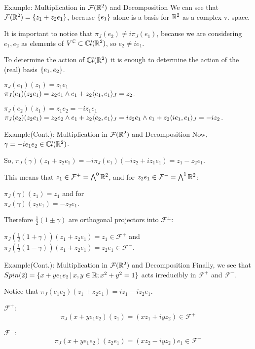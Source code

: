 \begin{frame}{Example: Multiplication in $\mathcal F(\mathbb R^2)$ and Decomposition} %
    We can see that $\mathcal F(\mathbb R^2) = \{z_1 + z_2 e_1\}$, because $\{e_1\}$ alone is a basis for $\mathbb R^2$ as a complex v. space.
    
    It is important to notice that $\pi_J(e_2) \neq i \pi_J(e_1)$, because we are considering $e_1, e_2$ as elements of $V^\mathbb C \subset \mathbb C l(\mathbb R^2)$, so $e_2 \neq i e_1$.
    
    To determine the action of $\mathbb C l(\mathbb R^2)$ it is enough to determine the action of the (real) basis $\{e_1, e_2\}$.
    
    
    $\pi_J(e_1) (z_1) = z_1 e_1$\\
    $\pi_J(e_1)(z_2 e_1) = z_2 e_1 \wedge e_1 + z_2 \langle e_1, e_1\rangle_J = z_2$.
    
    
    $\pi_J(e_2) (z_1) = z_1 e_2 = -i z_1 e_1$ \\
    $\pi_J(e_2)(z_2 e_1) = z_2 e_2 \wedge e_1 + z_2 \langle e_2, e_1\rangle_J = i z_2 e_1 \wedge e_1 + z_2\langle i e_1, e_1 \rangle_J = -i z_2$.
    
\end{frame}

\begin{frame}{Example(Cont.): Multiplication in $\mathcal F(\mathbb R^2)$ and Decomposition} %
    Now, $\gamma = -i e_1 e_2 \in \mathbb C l(\mathbb R^2)$.
    
    So, $\pi_J(\gamma) (z_1 + z_2 e_1) = -i \pi_J(e_1)(-iz_2 + iz_1e_1) = z_1 - z_2 e_1$.
    
   This means that $z_1 \in \mathcal F ^+ = \bigwedge^0 \mathbb R^2$, and for $z_2 e_1 \in \mathcal F ^- = \bigwedge^1 \mathbb R^2$:
    
    $\pi_J(\gamma)(z_1) = z_1$ \quad and for \\
    $\pi_J(\gamma)(z_2 e_1) = -z_2 e_1$.
    
    Therefore $\frac{1}{2}(1 \pm \gamma)$ are orthogonal projectors into $\mathcal F^\pm$:
    
    $\pi_J(\frac{1}{2}(1+\gamma))(z_1 + z_2e_1) = z_1 \in \mathcal F^+$ \quad and\\
    $\pi_J(\frac{1}{2}(1-\gamma))(z_1 + z_2e_1) = z_2 e_1 \in \mathcal F^-$.

\end{frame}

\begin{frame}{Example(Cont.): Multiplication in $\mathcal F(\mathbb R^2)$ and Decomposition} %
    Finally, we see that $Spin(2) = \{x + y e_1 e_2 \,|\, x, y \in \mathbb R; x^2 + y^2 = 1\}$ acts irreducibly in $\mathcal F^+$ and $\mathcal F^-$.
    
    Notice that $\pi_J(e_1 e_2)(z_1 + z_2 e_1) = iz_1 -iz_2 e_1$.
    
    $\mathcal F^+$:
        \[ \pi_J(x + y e_1 e_2)(z_1) = (xz_1 + iyz_2) \in \mathcal F^+\]
        
    $\mathcal F^-$:
        \[ \pi_J(x + y e_1 e_2)(z_2e_1) = (xz_2 - iyz_2)e_1 \in \mathcal F^-\]

\end{frame}

